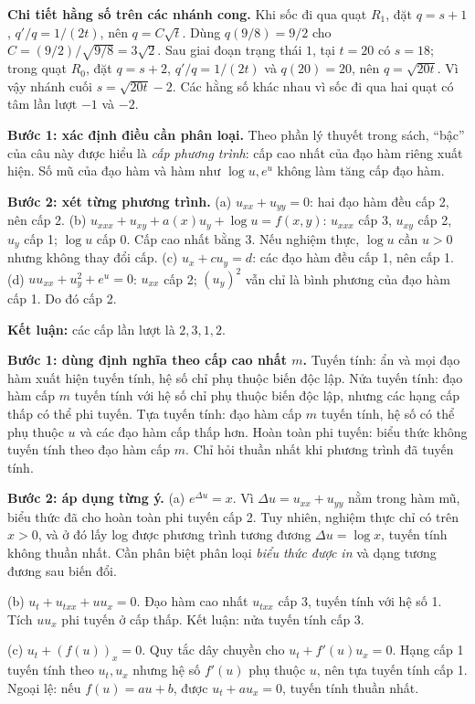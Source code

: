 \textbf{Chi tiết hằng số trên các nhánh cong.} Khi sốc đi qua quạt $R_1$, đặt $q=s+1$, $q'/q=1/(2t)$, nên $q=C\sqrt t$. Dùng $q(9/8)=9/2$ cho $C=(9/2)/\sqrt{9/8}=3\sqrt2$. Sau giai đoạn trạng thái $1$, tại $t=20$ có $s=18$; trong quạt $R_0$, đặt $q=s+2$, $q'/q=1/(2t)$ và $q(20)=20$, nên $q=\sqrt{20t}$. Vì vậy nhánh cuối $s=\sqrt{20t}-2$. Các hằng số khác nhau vì sốc đi qua hai quạt có tâm lần lượt $-1$ và $-2$.

\textbf{Bước 1: xác định điều cần phân loại.} Theo phần lý thuyết trong sách, ``bậc'' của câu này được hiểu là \emph{cấp phương trình}: cấp cao nhất của đạo hàm riêng xuất hiện. Số mũ của đạo hàm và hàm như $\log u,e^u$ không làm tăng cấp đạo hàm.

\textbf{Bước 2: xét từng phương trình.}
(a) $u_{xx}+u_{yy}=0$: hai đạo hàm đều cấp 2, nên cấp 2.
(b) $u_{xxx}+u_{xy}+a(x)u_y+\log u=f(x,y)$: $u_{xxx}$ cấp 3, $u_{xy}$ cấp 2, $u_y$ cấp 1; $\log u$ cấp 0. Cấp cao nhất bằng 3. Nếu nghiệm thực, $\log u$ cần $u>0$ nhưng không thay đổi cấp.
(c) $u_x+cu_y=d$: các đạo hàm đều cấp 1, nên cấp 1.
(d) $uu_{xx}+u_y^2+e^u=0$: $u_{xx}$ cấp 2; $(u_y)^2$ vẫn chỉ là bình phương của đạo hàm cấp 1. Do đó cấp 2.

\textbf{Kết luận:} các cấp lần lượt là $\boxed{2,3,1,2}$.

\textbf{Bước 1: dùng định nghĩa theo cấp cao nhất $m$.} Tuyến tính: ẩn và mọi đạo hàm xuất hiện tuyến tính, hệ số chỉ phụ thuộc biến độc lập. Nửa tuyến tính: đạo hàm cấp $m$ tuyến tính với hệ số chỉ phụ thuộc biến độc lập, nhưng các hạng cấp thấp có thể phi tuyến. Tựa tuyến tính: đạo hàm cấp $m$ tuyến tính, hệ số có thể phụ thuộc $u$ và các đạo hàm cấp thấp hơn. Hoàn toàn phi tuyến: biểu thức không tuyến tính theo đạo hàm cấp $m$. Chỉ hỏi thuần nhất khi phương trình đã tuyến tính.

\textbf{Bước 2: áp dụng từng ý.}
(a) $e^{\Delta u}=x$. Vì $\Delta u=u_{xx}+u_{yy}$ nằm trong hàm mũ, biểu thức đã cho hoàn toàn phi tuyến cấp 2. Tuy nhiên, nghiệm thực chỉ có trên $x>0$, và ở đó lấy log được phương trình tương đương $\Delta u=\log x$, tuyến tính không thuần nhất. Cần phân biệt phân loại \emph{biểu thức được in} và dạng tương đương sau biến đổi.

(b) $u_t+u_{txx}+uu_x=0$. Đạo hàm cao nhất $u_{txx}$ cấp 3, tuyến tính với hệ số 1. Tích $uu_x$ phi tuyến ở cấp thấp. Kết luận: nửa tuyến tính cấp 3.

(c) $u_t+(f(u))_x=0$. Quy tắc dây chuyền cho $u_t+f'(u)u_x=0$. Hạng cấp 1 tuyến tính theo $u_t,u_x$ nhưng hệ số $f'(u)$ phụ thuộc $u$, nên tựa tuyến tính cấp 1. Ngoại lệ: nếu $f(u)=au+b$, được $u_t+au_x=0$, tuyến tính thuần nhất.

